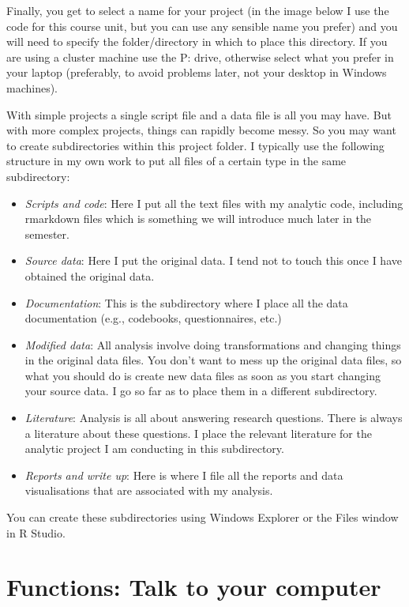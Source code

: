 \documentclass[
]{book}
\begin{document}
Finally, you get to select a name for your project (in the image below I use the code for this course unit, but you can use any sensible name you prefer) and you will need to specify the folder/directory in which to place this directory. If you are using a cluster machine use the P: drive, otherwise select what you prefer in your laptop (preferably, to avoid problems later, not your desktop in Windows machines).

With simple projects a single script file and a data file is all you may have. But with more complex projects, things can rapidly become messy. So you may want to create subdirectories within this project folder. I typically use the following structure in my own work to put all files of a certain type in the same subdirectory:

\begin{itemize}
\item
  \emph{Scripts and code}: Here I put all the text files with my analytic code, including rmarkdown files which is something we will introduce much later in the semester.
\item
  \emph{Source data}: Here I put the original data. I tend not to touch this once I have obtained the original data.
\item
  \emph{Documentation}: This is the subdirectory where I place all the data documentation (e.g., codebooks, questionnaires, etc.)
\item
  \emph{Modified data}: All analysis involve doing transformations and changing things in the original data files. You don't want to mess up the original data files, so what you should do is create new data files as soon as you start changing your source data. I go so far as to place them in a different subdirectory.
\item
  \emph{Literature}: Analysis is all about answering research questions. There is always a literature about these questions. I place the relevant literature for the analytic project I am conducting in this subdirectory.
\item
  \emph{Reports and write up}: Here is where I file all the reports and data visualisations that are associated with my analysis.
\end{itemize}

You can create these subdirectories using Windows Explorer or the Files window in R Studio.

\section{Functions: Talk to your computer}\label{functions-talk-to-your-computer}
\end{document}
